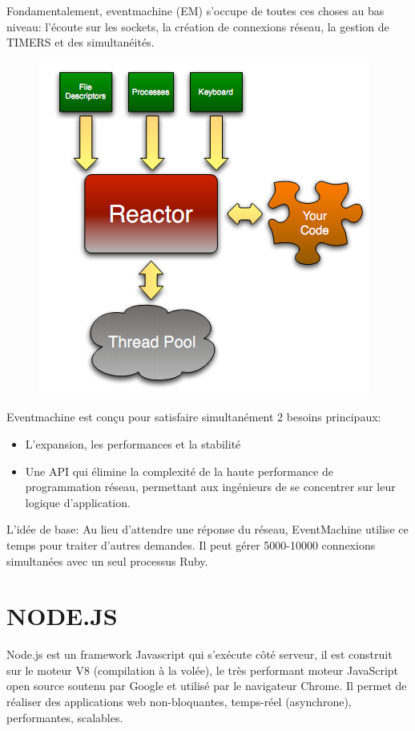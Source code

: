 \documentclass[a4paper,10pt]{report}
\begin{document}
Fondamentalement, eventmachine (EM) s'occupe de toutes ces choses au bas niveau: l'écoute sur les sockets, la création de connexions réseau, la gestion de TIMERS  et des simultanéités. 
  \begin{figure}[!ht]
    \centering
    \includegraphics[scale=0.7, bb=0 0 414 415]{img/RubyEM.png} 
  \end{figure}


Eventmachine est conçu pour satisfaire simultanément 2 besoins principaux:
\begin{itemize}
 \item L’expansion, les performances et la stabilité
 \item Une API qui élimine la complexité de la haute performance de programmation réseau, permettant aux ingénieurs de se concentrer sur leur logique d'application.
\end{itemize}


L'idée de base: Au lieu d'attendre une réponse du réseau, EventMachine utilise ce temps pour traiter d'autres demandes. Il peut gérer 5000-10000 connexions simultanées avec un seul processus Ruby. 

  \section{NODE.JS}
Node.js est un framework Javascript qui s'exécute côté serveur, il est construit sur le moteur V8 (compilation à la volée), le très performant moteur JavaScript open source soutenu par Google et utilisé par le navigateur Chrome. Il permet de réaliser des applications web non-bloquantes, temps-réel (asynchrone), performantes, scalables.
\end{document}
